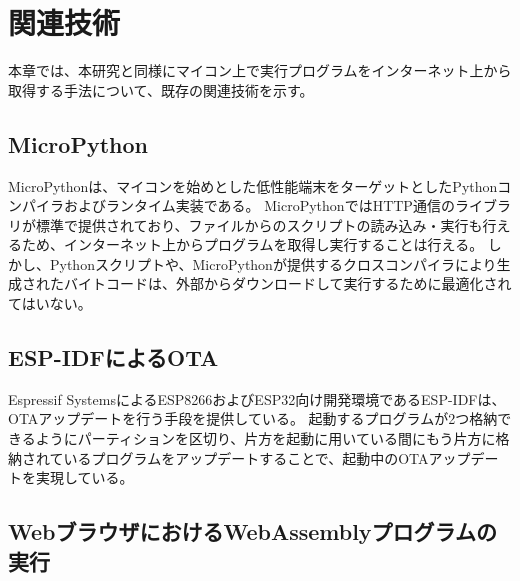 \chapter{関連技術}
\label{chap:related_works}

本章では、本研究と同様にマイコン上で実行プログラムをインターネット上から取得する手法について、既存の関連技術を示す。

\section{MicroPython}

MicroPythonは、マイコンを始めとした低性能端末をターゲットとしたPythonコンパイラおよびランタイム実装である\cite{micropython}。
MicroPythonではHTTP通信のライブラリが標準で提供されており、ファイルからのスクリプトの読み込み・実行も行えるため、インターネット上からプログラムを取得し実行することは行える。
しかし、Pythonスクリプトや、MicroPythonが提供するクロスコンパイラにより生成されたバイトコードは、外部からダウンロードして実行するために最適化されてはいない。

\section{ESP-IDFによるOTA}

Espressif SystemsによるESP8266およびESP32向け開発環境であるESP-IDF\cite{esp_idf}は、OTAアップデートを行う手段を提供している\cite{esp_ota}。
起動するプログラムが2つ格納できるようにパーティションを区切り、片方を起動に用いている間にもう片方に格納されているプログラムをアップデートすることで、起動中のOTAアップデートを実現している。

\section{WebブラウザにおけるWebAssemblyプログラムの実行}
